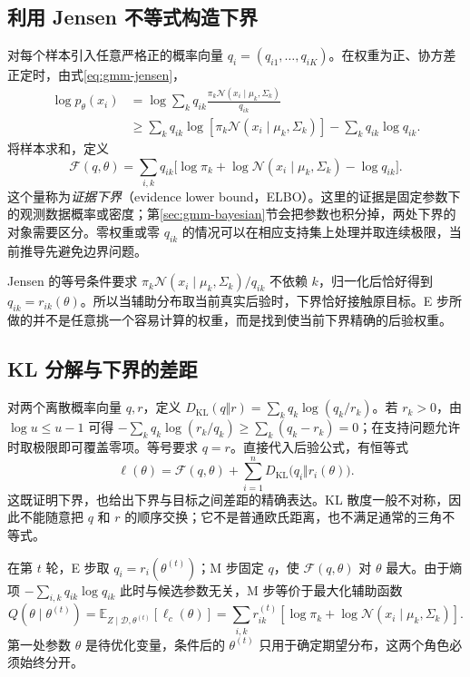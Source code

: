 \documentclass[UTF8,12pt,a4paper,fontset=fandol]{ctexart}
\begin{document}
\subsection{利用 Jensen 不等式构造下界}
对每个样本引入任意严格正的概率向量 $q_i=(q_{i1},\ldots,q_{iK})$。在权重为正、协方差正定时，由式\eqref{eq:gmm-jensen}，
\begin{align}
\log p_\theta(x_i)
&=\log\sum_kq_{ik}\frac{\pi_k\mathcal N(x_i\mid\mu_k,\Sigma_k)}{q_{ik}}\nonumber\\
&\geq\sum_kq_{ik}\log[\pi_k\mathcal N(x_i\mid\mu_k,\Sigma_k)]
-\sum_kq_{ik}\log q_{ik}.\label{eq:gmm-elbo-point}
\end{align}
将样本求和，定义
\begin{equation}
\mathcal F(q,\theta)=\sum_{i,k}q_{ik}\bigl[\log\pi_k+
\log\mathcal N(x_i\mid\mu_k,\Sigma_k)-\log q_{ik}\bigr].
\label{eq:gmm-elbo}
\end{equation}
这个量称为\emph{证据下界}（evidence lower bound，ELBO）。这里的证据是固定参数下的观测数据概率或密度；第\ref{sec:gmm-bayesian}节会把参数也积分掉，两处下界的对象需要区分。零权重或零 $q_{ik}$ 的情况可以在相应支持集上处理并取连续极限，当前推导先避免边界问题。

Jensen 的等号条件要求 $\pi_k\mathcal N(x_i\mid\mu_k,\Sigma_k)/q_{ik}$ 不依赖 $k$，归一化后恰好得到 $q_{ik}=r_{ik}(\theta)$。所以当辅助分布取当前真实后验时，下界恰好接触原目标。E 步所做的并不是任意挑一个容易计算的权重，而是找到使当前下界精确的后验权重。

\subsection{KL 分解与下界的差距}
对两个离散概率向量 $q,r$，定义 $D_{\mathrm{KL}}(q\Vert r)=\sum_kq_k\log(q_k/r_k)$。若 $r_k>0$，由 $\log u\leq u-1$ 可得
$-\sum_kq_k\log(r_k/q_k)\geq\sum_k(q_k-r_k)=0$；在支持问题允许时取极限即可覆盖零项。等号要求 $q=r$。直接代入后验公式，有恒等式
\begin{equation}
\ell(\theta)=\mathcal F(q,\theta)+\sum_{i=1}^nD_{\mathrm{KL}}\bigl(q_i\Vert r_i(\theta)\bigr).
\label{eq:gmm-kl-decomposition}
\end{equation}
这既证明下界，也给出下界与目标之间差距的精确表达。KL 散度一般不对称，因此不能随意把 $q$ 和 $r$ 的顺序交换；它不是普通欧氏距离，也不满足通常的三角不等式。

在第 $t$ 轮，E 步取 $q_i=r_i(\theta^{(t)})$；M 步固定 $q$，使 $\mathcal F(q,\theta)$ 对 $\theta$ 最大。由于熵项 $-\sum_{i,k}q_{ik}\log q_{ik}$ 此时与候选参数无关，M 步等价于最大化辅助函数
\begin{equation}
Q(\theta\mid\theta^{(t)})=
\mathbb E_{Z\mid\mathcal D,\theta^{(t)}}[\ell_c(\theta)]
=\sum_{i,k}r_{ik}^{(t)}[\log\pi_k+\log\mathcal N(x_i\mid\mu_k,\Sigma_k)].
\label{eq:gmm-q-function}
\end{equation}
第一处参数 $\theta$ 是待优化变量，条件后的 $\theta^{(t)}$ 只用于确定期望分布，这两个角色必须始终分开。
\end{document}
